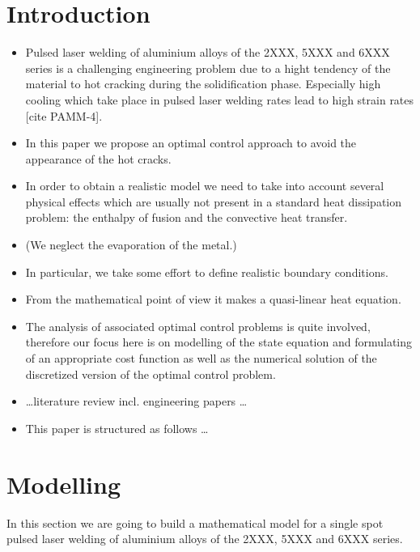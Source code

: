 \section{Introduction}
\label{sec:introduction}

\begin{itemize}
	\item Pulsed laser welding of aluminium alloys of the 2XXX, 5XXX and 6XXX series is a challenging engineering problem due to a hight tendency of the material to hot cracking during the solidification phase. Especially high cooling which take place in pulsed laser welding rates lead to high strain rates [cite PAMM-4].
	\item In this paper we propose an optimal control approach to avoid the appearance of the hot cracks.
	\item In order to obtain a realistic model we need to take into account several physical effects which are usually not present in a standard heat dissipation problem: the enthalpy of fusion and the convective heat transfer.
	\item (We neglect the evaporation of the metal.)
	\item In particular, we take some effort to define realistic boundary conditions.
	\item From the mathematical point of view it makes a quasi-linear heat equation.
	\item The analysis of associated optimal control problems is quite involved, therefore our focus here is on modelling of the state equation and formulating of an appropriate cost function as well as the numerical solution of the discretized version of the optimal control problem.
	\item \ldots literature review incl. engineering papers \ldots
	\item This paper is structured as follows \ldots
\end{itemize}


\section{Modelling}
\label{sec:modelling}

In this section we are going to build a mathematical model for a single spot pulsed laser welding of aluminium alloys of the 2XXX, 5XXX and 6XXX series.

